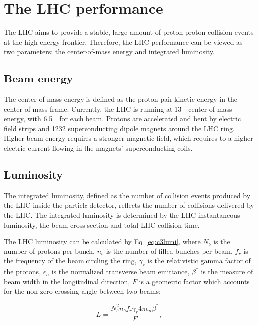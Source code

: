 \section{The LHC performance}
\label{sec:lhcs1}
\par The LHC aims to provide a stable, large amount of proton-proton collision events at the high energy frontier. Therefore, the LHC performance can be viewed as two parameters: the center-of-mass energy and integrated luminosity.

\subsection{Beam energy}
\par The center-of-mass energy is defined as the proton pair kinetic energy in the center-of-mass frame. Currently, the LHC is running at 13~\TeV~center-of-mass energy, with 6.5~\TeV~for each beam. Protons are accelerated and bent by electric field strips and 1232 superconducting dipole magnets around the LHC ring. Higher beam energy requires a stronger magnetic field, which requires to a higher electric current flowing in the magnets' superconducting coils.

\subsection{Luminosity}
\par The integrated luminosity, defined as the number of collision events produced by the LHC inside the particle detector, reflects the number of collisions delivered by the LHC. The integrated luminosity is determined by the LHC instantaneous luminosity, the beam cross-section and total LHC collision time.

\par The LHC luminosity can be calculated by Eq~\ref{eq:c3lumi}, where $N_{b}$ is the number of protons per bunch, $n_{b}$ is the number of filled bunches per beam, $f_{r}$ is the frequency of the beam circling the ring, $\gamma_{r}$ is the relativistic gamma factor of the protons, $\epsilon_{n}$ is the normalized transverse beam emittance, $\beta^{*}$ is the measure of beam width in the longitudinal direction, $F$ is a geometric factor which accounts for the non-zero crossing angle between two beams:

\begin{equation}
  L = \frac{N_{b}^{2}n_{b}f_{r}\gamma_{r}4\pi\epsilon_{n}\beta^{*}}{F},
  \label{eq:c3lumi}
\end{equation}

